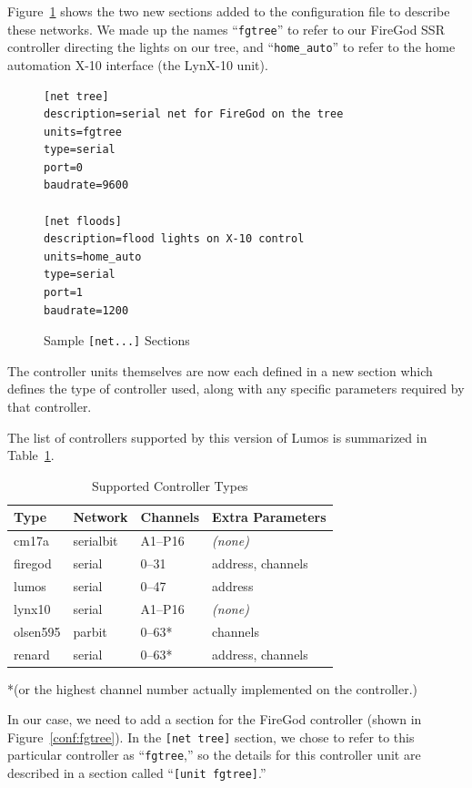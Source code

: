 \documentclass{article}
\begin{document}
Figure~\ref{conf:nets} shows the two new sections added to the configuration
file to describe these networks.  We made up the names ``{\tt fgtree}'' to refer to
our FireGod SSR controller directing the lights on our tree, and
``\verb+home_auto+'' to refer to the home automation X-10 interface (the LynX-10
unit).

\begin{figure}[htbp]
\begin{verbatim}
[net tree]
description=serial net for FireGod on the tree
units=fgtree
type=serial
port=0
baudrate=9600

[net floods]
description=flood lights on X-10 control
units=home_auto
type=serial
port=1
baudrate=1200
\end{verbatim}
\caption{Sample {\tt[net...]} Sections}
\label{conf:nets}
\end{figure}

The controller units themselves are now each defined in a new section which
defines the type of controller used, along with any specific parameters
required by that controller.

The list of controllers supported by this version of Lumos is summarized in
Table~\ref{conf:controllers}.  

\begin{table}[htbp]
\begin{center}
\begin{tabular}{|l|l|l|l|}\hline
\bf Type   & \bf Network   & \bf Channels & \bf Extra Parameters \\\hline\hline
cm17a      & serialbit     & A1--P16      & {\it(none)}\\\hline
firegod    & serial        & 0--31        & address, channels\\\hline
lumos      & serial        & 0--47        & address\\\hline
lynx10     & serial        & A1--P16      & {\it(none)}\\\hline
olsen595   & parbit        & 0--63*       & channels\\\hline
renard     & serial        & 0--63*       & address, channels\\\hline
\end{tabular}
\end{center}
*(or the highest channel number actually implemented on the controller.)
\caption{Supported Controller Types}
\label{conf:controllers}
\end{table}

In our case, we need to add a section for the FireGod controller (shown in
Figure~\ref{conf:fgtree}).  In the {\tt[net~tree]} section, we chose to refer 
to this particular controller as ``{\tt fgtree},'' so the details for this
controller unit are described in a section called ``{\tt[unit fgtree]}.''
\end{document}
